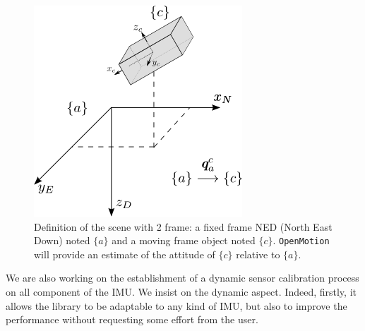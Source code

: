 \begin{figure}
\centering
\includegraphics[scale=0.65]{images/Schema_situation.png}
\caption{Definition of the scene with 2 frame:  a fixed frame NED (North East Down) noted $\{a\}$ and a moving frame object noted $\{c\}$. \texttt{OpenMotion} will provide an estimate of the attitude of $\{c\}$ relative to $\{a\}$. }
\label{Schema_situation}
\end{figure}

We are also working on the establishment of a dynamic sensor calibration process on all component of the IMU. We insist on the dynamic aspect. Indeed, firstly, it allows  the library to be adaptable to any kind of IMU, but also to improve the performance without requesting some effort from the user.

